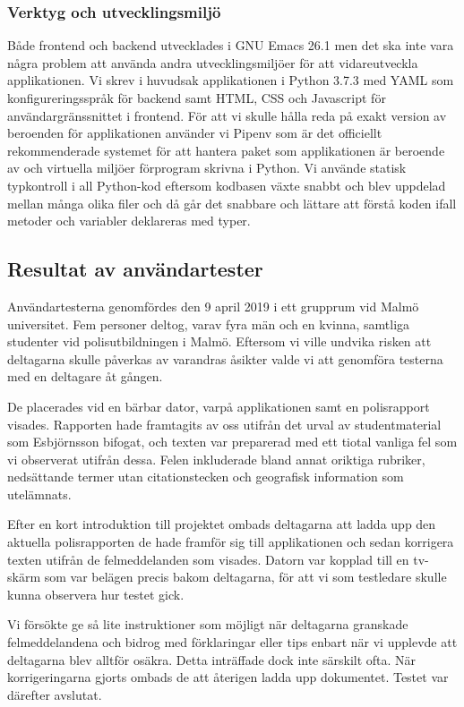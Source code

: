 \documentclass[swedish]{maucsthesis}
\begin{document}
\subsubsection{Verktyg och utvecklingsmiljö}

Både frontend och backend utvecklades i GNU Emacs 26.1 men det ska inte vara några
problem att använda andra utvecklingsmiljöer för att vidareutveckla
applikationen. Vi skrev i huvudsak applikationen i Python 3.7.3 med YAML som
konfigureringsspråk för backend samt HTML, CSS och Javascript för
användargränssnittet i frontend. För att vi skulle hålla reda på exakt version
av beroenden för applikationen använder vi Pipenv som är det officiellt
rekommenderade systemet för att hantera paket som applikationen är beroende av
och virtuella miljöer förprogram skrivna i Python. Vi använde statisk typkontroll
i all Python-kod eftersom kodbasen växte snabbt och blev uppdelad
mellan många olika filer och då går det snabbare och lättare att förstå
koden ifall metoder och variabler deklareras med typer.


\subsection{Resultat av användartester}

Användartesterna genomfördes den 9 april 2019 i ett grupprum vid Malmö
universitet. Fem personer deltog, varav fyra män och en kvinna, samtliga
studenter vid polisutbildningen i Malmö. Eftersom vi ville undvika risken att
deltagarna skulle påverkas av varandras åsikter valde vi att genomföra testerna
med en deltagare åt gången.

De placerades vid en bärbar dator, varpå applikationen samt en polisrapport
visades. Rapporten hade framtagits av oss utifrån det urval av studentmaterial
som Esbjörnsson bifogat, och texten var preparerad med ett tiotal vanliga
fel som vi observerat utifrån dessa. Felen inkluderade bland annat oriktiga
rubriker, nedsättande termer utan citationstecken och geografisk information som
utelämnats.

Efter en kort introduktion till projektet ombads deltagarna att ladda upp den
aktuella polisrapporten de hade framför sig till applikationen och sedan
korrigera texten utifrån de felmeddelanden som visades. Datorn var kopplad till
en tv-skärm som var belägen precis bakom deltagarna, för att vi som
testledare skulle kunna observera hur testet gick.

Vi försökte ge så lite instruktioner som möjligt när deltagarna granskade
felmeddelandena och bidrog med förklaringar eller tips enbart när vi upplevde
att deltagarna blev alltför osäkra. Detta inträffade dock inte särskilt ofta.
När korrigeringarna gjorts ombads de att återigen ladda upp dokumentet. Testet
var därefter avslutat.
\end{document}
